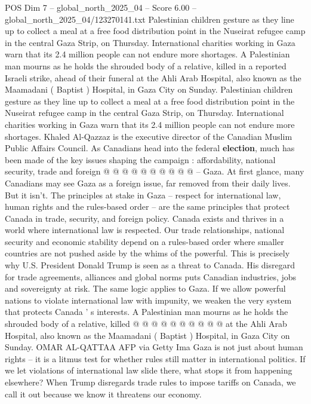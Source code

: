 \begin{textsample}{POS Dim 7 – global\_north\_2025\_04 – Score 6.00 – global\_north\_2025\_04/123270141.txt}  \label{ex:f7_pos_364}
Palestinian children gesture as they line up to collect a meal at a free food distribution point in the Nuseirat refugee camp in the central Gaza Strip, on Thursday.
International charities working in Gaza warn that its 2.4 million people can not endure more shortages.
A Palestinian man mourns as he holds the shrouded body of a relative, killed in a reported Israeli strike, ahead of their funeral at the Ahli Arab Hospital, also known as the Maamadani ( Baptist ) Hospital, in Gaza City on Sunday.
Palestinian children gesture as they line up to collect a meal at a free food distribution point in the Nuseirat refugee camp in the central Gaza Strip, on Thursday.
International charities working in Gaza warn that its 2.4 million people can not endure more shortages.
Khaled Al-Qazzaz is the executive director of the Canadian Muslim Public Affairs Council.
As Canadians head into the federal \textbf{election}, much has been made of the key issues shaping the campaign : affordability, national security, trade and foreign @ @ @ @ @ @ @ @ @ @ -- Gaza.
At first glance, many Canadians may see Gaza as a foreign issue, far removed from their daily lives.
But it isn't.
The principles at stake in Gaza -- respect for international law, human rights and the rules-based order -- are the same principles that protect Canada in trade, security, and foreign policy.
Canada exists and thrives in a world where international law is respected.
Our trade relationships, national security and economic stability depend on a rules-based order where smaller countries are not pushed aside by the whims of the powerful.
This is precisely why U.S.
President Donald Trump is seen as a threat to Canada.
His disregard for trade agreements, alliances and global norms puts Canadian industries, jobs and sovereignty at risk.
The same logic applies to Gaza.
If we allow powerful nations to violate international law with impunity, we weaken the very system that protects Canada ' s interests.
A Palestinian man mourns as he holds the shrouded body of a relative, killed @ @ @ @ @ @ @ @ @ @ at the Ahli Arab Hospital, also known as the Maamadani ( Baptist ) Hospital, in Gaza City on Sunday.
OMAR AL-QATTAA AFP via Getty Ima Gaza is not just about human rights -- it is a litmus test for whether rules still matter in international politics.
If we let violations of international law slide there, what stops it from happening elsewhere?
When Trump disregards trade rules to impose tariffs on Canada, we call it out because we know it threatens our economy.

\end{textsample}

